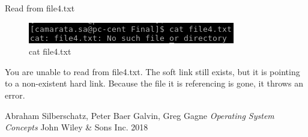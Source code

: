 \documentclass[10pt]{article}
\begin{document}
Read from file4.txt

\begin{figure}[H]
\centering
\includegraphics[scale=0.5]{./images/ss14.png}
\caption{cat file4.txt}
\label{cat file4.txt}
\end{figure}

You are unable to read from file4.txt.  The soft link still exists, but it is pointing to a non-existent hard link.  Because the file it is referencing is gone, it throws an error.

\pagebreak
\begin{thebibliography}{9}
Abraham Silberschatz, Peter Baer Galvin, Greg Gagne
\textit{Operating System Concepts}
John Wiley \& Sons Inc. 2018
\end{thebibliography}
\end{document}
